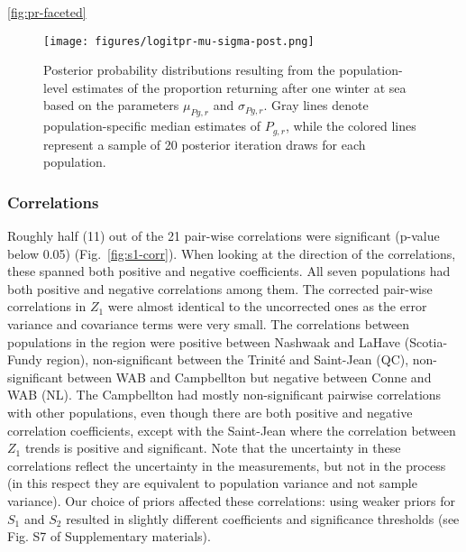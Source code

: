 \documentclass[12pt]{article}
\newcommand{\So}{$S_{1}$\xspace}
\newcommand{\St}{$S_{2}$\xspace}
\newcommand{\prmu}{$\mu_{Pg,r}$\xspace}
\newcommand{\prsig}{$\sigma_{Pg,r}$\xspace}
\begin{document}
\ref{fig:pr-faceted}


% 

% 



\begin{figure}[htbp] \centering
    \texttt{[image: figures/logitpr-mu-sigma-post.png]}
    \caption{Posterior probability distributions resulting from the population-level estimates of the proportion returning after one winter at sea based on
        the parameters \prmu and \prsig. Gray lines denote population-specific median estimates of $P_{g,r}$, while
       the colored lines represent a sample of 20 posterior iteration draws for each population.}
   \label{fig:prmu-post}
\end{figure}


\subsubsection*{Correlations}

Roughly half (11) out of the 21 pair-wise correlations were significant (p-value below 0.05)
(Fig.~\ref{fig:s1-corr}). When looking at the direction of the correlations,
these spanned both positive and negative coefficients. All seven populations had both
positive and negative correlations among them.
The corrected pair-wise correlations in $Z_1$ were almost identical to the
uncorrected ones as the error variance and covariance terms were very small.
The correlations between populations in the region were positive between Nashwaak and LaHave (Scotia-Fundy region), non-significant between the Trinit\'{e} and Saint-Jean (QC),
non-significant between WAB and Campbellton but negative between Conne and WAB (NL).
The Campbellton had mostly non-significant pairwise correlations with other populations, even though there are both positive and negative correlation coefficients, except with the Saint-Jean
where the correlation between $Z_1$ trends is positive and significant.
Note that the uncertainty in these correlations reflect the uncertainty in the
measurements, but not in the process (in this respect they are equivalent to
population variance and not sample variance).
Our choice of priors affected these correlations:
using weaker priors for \So and \St resulted in slightly different coefficients and significance thresholds (see Fig. S7 of Supplementary materials). 
\end{document}
